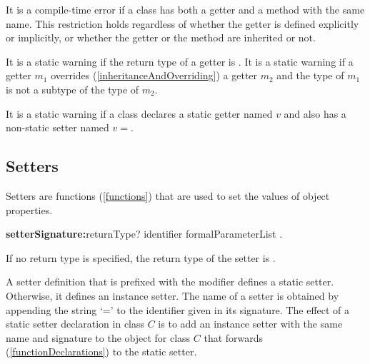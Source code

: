 \documentclass{article}
\begin{document}
\LMHash{}
It is a compile-time error if a class has both a getter and a method with the same name.
This restriction holds regardless of whether the getter is defined explicitly or implicitly, or whether the getter or the method are inherited or not.


\LMHash{}
It is a static warning if the return type of a getter is \VOID.
It is a static warning if a getter $m_1$ overrides (\ref{inheritanceAndOverriding}) a getter
$m_2$ and the type of $m_1$ is not a subtype of the type of $m_2$.

\LMHash{}
It is a static warning if a class declares a static getter named $v$ and also has a non-static setter named $v=$.



\subsection{Setters}

\LMHash{}
Setters are functions (\ref{functions}) that are used to set the values of object properties.

\begin{grammar}
{\bf setterSignature:}returnType? \SET{} identifier formalParameterList
  .
\end{grammar}

\LMHash{}
If no return type is specified, the return type of the setter is \DYNAMIC{}.

\LMHash{}
A setter definition that is prefixed with the \STATIC{} modifier defines a static setter.
Otherwise, it defines an instance setter.
The name of a setter is obtained by appending the string `=' to the identifier given in its signature.
The effect of a static setter declaration in class $C$ is to add an instance setter with the same name and signature to the  object for class $C$ that forwards (\ref{functionDeclarations}) to the static setter.
\end{document}

